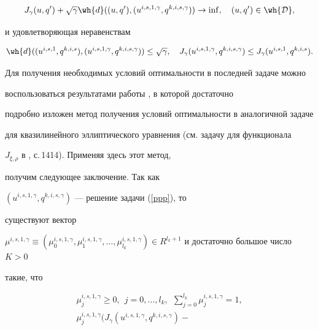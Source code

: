 \begin{pf}
\begin{equation}\label{ppp}


J_\gamma(u,q^\prime)+\sqrt{\gamma}\wh{d}((u,q^\prime),


(u^{i,s,1,\gamma},q^{k,i,s,\gamma}))\to\inf,


\quad (u,q^\prime)\in\wh{{\cal D}},


\end{equation}


и удовлетворяющая неравенствам


\begin{equation}\label{eaa}


\wh{d}((u^{i,s,1},q^{k,i,s}),(u^{i,s,1,\gamma},q^{k,i,s,\gamma}))\leq


\sqrt{\gamma},  \quad


J_\gamma(u^{i,s,1,\gamma},q^{k,i,s,\gamma})\leq J_\gamma(u^{i,s,1},q^{k,i,s}).


\end{equation}


Для получения необходимых условий оптимальности в последней задаче можно


воспользоваться результатами работы \cite{sumqual}, в которой достаточно


подробно изложен метод получения условий оптимальности в аналогичной задаче


для квазилинейного эллиптического уравнения (см. задачу для функционала


$J_{\xi,\rho}$ в \cite{sumqual}, с.\,1414). Применяя здесь этот метод,


получим следующее заключение. Так как


$(u^{i,s,1,\gamma},q^{k,i,s,\gamma})$ --- решение задачи (\ref{ppp}), то


существуют вектор


$\mu^{i,s,1,\gamma}\equiv(\mu^{i,s,1,\gamma}_0,\mu^{i,s,1,\gamma}_1,\dotsc,


\mu^{i,s,1,\gamma}_{l_k})\in R^{l_k+1}$ и достаточно большое число $K>0$


такие, что


\begin{gather*}


\mu^{i,s,1,\gamma}_j\geq 0,\ \  j=0,\dotsc,l_k,  


\ \ \sum\limits_{j=0}^{l_k}\mu^{i,s,1,\gamma}_j=1,\\


%


\mu^{i,s,1,\gamma}_j(J_\gamma(u^{i,s,1,\gamma},q^{k,i,s,\gamma})-



\end{gather*}
\end{pf}
